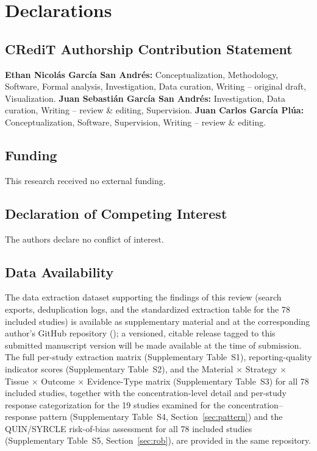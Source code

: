 \documentclass[5p,times,twocolumn]{elsarticle}
\begin{document}
\section*{Declarations}

\subsection*{CRediT Authorship Contribution Statement}

\textbf{Ethan Nicolás García San Andrés:} Conceptualization, Methodology, Software, Formal analysis, Investigation, Data curation, Writing -- original draft, Visualization. \textbf{Juan Sebastián García San Andrés:} Investigation, Data curation, Writing -- review \& editing, Supervision. \textbf{Juan Carlos García Plúa:} Conceptualization, Software, Supervision, Writing -- review \& editing.

\subsection*{Funding}

This research received no external funding.

\subsection*{Declaration of Competing Interest}

The authors declare no conflict of interest.

\subsection*{Data Availability}

The data extraction dataset supporting the findings of this review (search exports, deduplication logs, and the standardized extraction table for the 78 included studies) is available as supplementary material and at the corresponding author's GitHub repository (); a versioned, citable release tagged to this submitted manuscript version will be made available at the time of submission. The full per-study extraction matrix (Supplementary Table~S1), reporting-quality indicator scores (Supplementary Table~S2), and the Material $\times$ Strategy $\times$ Tissue $\times$ Outcome $\times$ Evidence-Type matrix (Supplementary Table~S3) for all 78 included studies, together with the concentration-level detail and per-study response categorization for the 19 studies examined for the concentration--response pattern (Supplementary Table~S4, Section~\ref{sec:pattern}) and the QUIN/SYRCLE risk-of-bias assessment for all 78 included studies (Supplementary Table~S5, Section~\ref{sec:rob}), are provided in the same repository.
\end{document}
